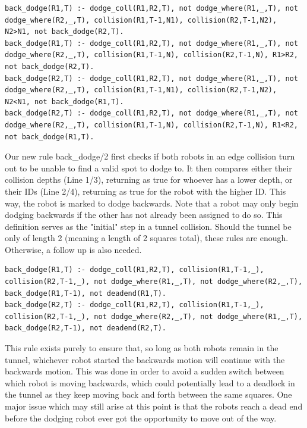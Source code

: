 \documentclass{llncs}
\begin{document}
\begin{lstlisting}[basicstyle=\fontsize{9}{11}\selectfont\ttfamily,frame=single,breaklines=true]
back_dodge(R1,T) :- dodge_coll(R1,R2,T), not dodge_where(R1,_,T), not dodge_where(R2,_,T), collision(R1,T-1,N1), collision(R2,T-1,N2), N2>N1, not back_dodge(R2,T).
back_dodge(R1,T) :- dodge_coll(R1,R2,T), not dodge_where(R1,_,T), not dodge_where(R2,_,T), collision(R1,T-1,N), collision(R2,T-1,N), R1>R2, not back_dodge(R2,T).
back_dodge(R2,T) :- dodge_coll(R1,R2,T), not dodge_where(R1,_,T), not dodge_where(R2,_,T), collision(R1,T-1,N1), collision(R2,T-1,N2), N2<N1, not back_dodge(R1,T).
back_dodge(R2,T) :- dodge_coll(R1,R2,T), not dodge_where(R1,_,T), not dodge_where(R2,_,T), collision(R1,T-1,N), collision(R2,T-1,N), R1<R2, not back_dodge(R1,T).
\end{lstlisting}
Our new rule back\_dodge/2 first checks if both robots in an edge collision turn out to be unable to find a valid spot to dodge to. It then compares either their collision depths (Line 1/3), returning as true for whoever has a lower depth, or their IDs (Line 2/4), returning as true for the robot with the higher ID. This way, the robot is marked to dodge backwards. Note that a robot may only begin dodging backwards if the other has not already been assigned to do so.\newline\newline
This definition serves as the "initial" step in a tunnel collision. Should the tunnel be only of length 2 (meaning a length of 2 squares total), these rules are enough. Otherwise, a follow up is also needed.
\begin{lstlisting}[basicstyle=\fontsize{9}{11}\selectfont\ttfamily,frame=single,breaklines=true]
back_dodge(R1,T) :- dodge_coll(R1,R2,T), collision(R1,T-1,_), collision(R2,T-1,_), not dodge_where(R1,_,T), not dodge_where(R2,_,T), back_dodge(R1,T-1), not deadend(R1,T).
back_dodge(R2,T) :- dodge_coll(R1,R2,T), collision(R1,T-1,_), collision(R2,T-1,_), not dodge_where(R2,_,T), not dodge_where(R1,_,T),  back_dodge(R2,T-1), not deadend(R2,T).
\end{lstlisting}
This rule exists purely to ensure that, so long as both robots remain in the tunnel, whichever robot started the backwards motion will continue with the backwards motion. This was done in order to avoid a sudden switch between which robot is moving backwards, which could potentially lead to a deadlock in the tunnel as they keep moving back and forth between the same squares.\newline
One major issue which may still arise at this point is that the robots reach a dead end before the dodging robot ever got the opportunity to move out of the way. 
\end{document}
